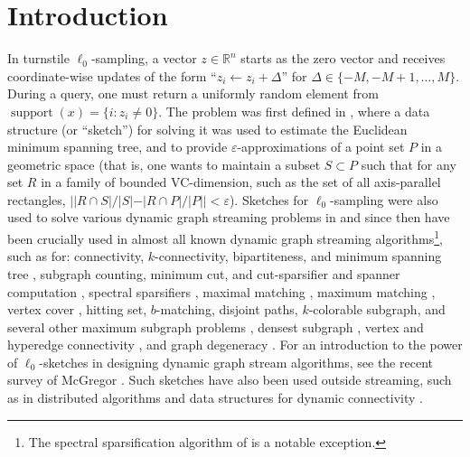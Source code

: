 \documentclass[11pt]{article}
\newcommand{\supp}{\mathop{support}}
\newcommand{\R}{\mathbb{R}}
\newcommand{\eps}{\varepsilon}
\begin{document}
\newpage


\section{Introduction}\label{sec:intro}
In turnstile $\ell_0$-sampling, a vector $z\in\R^n$ starts as the zero vector and receives coordinate-wise updates of the form ``$z_i \leftarrow z_i + \Delta$'' for $\Delta\in\{-M,-M+1,\ldots,M\}$. During a query, one must return a uniformly random element from $\supp(x) = \{i : z_i\neq 0\}$. The problem was first defined in \cite{FrahlingIS08}, where a data structure (or ``sketch'') for solving it was used to estimate the Euclidean minimum spanning tree, and to provide $\eps$-approximations of a point set $P$ in a geometric space (that is, one wants to maintain a subset $S\subset P$ such that for any set $R$ in a family of bounded VC-dimension, such as the set of all axis-parallel rectangles, $||R\cap S|/|S| - |R\cap P|/|P|| < \eps$). Sketches for $\ell_0$-sampling were also used to solve various dynamic graph streaming problems in \cite{AhnGM12a} and since then have been crucially used in almost all known dynamic graph streaming algorithms\footnote{\label{specfootnote}The spectral sparsification algorithm of \cite{KapralovLMMS14} is a notable exception.}, such as for: connectivity, $k$-connectivity, bipartiteness, and minimum spanning tree \cite{AhnGM12a}, subgraph counting, minimum cut, and cut-sparsifier and spanner computation \cite{AhnGM12b}, spectral sparsifiers \cite{AhnGM13}, maximal matching \cite{ChitnisCHM15}, maximum matching \cite{AhnGM12a,BuryS15,Konrad15,AssadiKLY16,ChitnisCEHMMV16,AssadiKL17}, vertex cover \cite{ChitnisCHM15,ChitnisCEHMMV16}, hitting set, $b$-matching, disjoint paths, $k$-colorable subgraph, and several other maximum subgraph problems \cite{ChitnisCEHMMV16}, densest subgraph \cite{BhattacharyaHNT15,McGregorTVV15,EsfandiariHW16}, vertex and hyperedge connectivity \cite{GuhaMT15}, and graph degeneracy \cite{FarachColtonT16}. For an introduction to the power of $\ell_0$-sketches in designing dynamic graph stream algorithms, see the recent survey of McGregor \cite[Section 3]{McGregor14}. Such sketches have also been used outside streaming, such as in distributed algorithms \cite{HegemanPPSS15,Pandurangan0S16} and data structures for dynamic connectivity \cite{KapronKM13,Wang15,GibbKKT15}.
\end{document}
